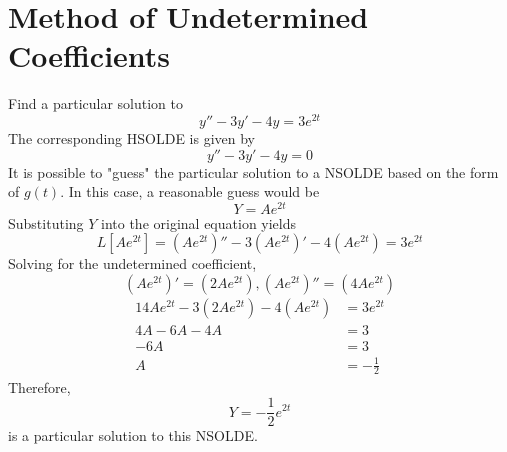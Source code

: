 \documentclass[diffeq.tex]{subfiles}
\begin{document}
    \section{Method of Undetermined Coefficients}
    \begin{example}
        Find a particular solution to
        \begin{equation}
            y''-3y'-4y=3e^{2t}
        \end{equation}
        The corresponding HSOLDE is given by
        \begin{equation}
            y'' - 3y' -4y = 0
        \end{equation}
        It is possible to "guess" the particular solution to a NSOLDE based on the form of $g(t)$. In this case, a reasonable guess would be
        \begin{equation}
            Y = Ae^{2t}
        \end{equation}
        Substituting $Y$ into the original equation yields
        \begin{equation}
            L[Ae^{2t}] = (Ae^{2t})'' - 3(Ae^{2t})' - 4(Ae^{2t}) = 3e^{2t}
        \end{equation}
        Solving for the undetermined coefficient,
        \begin{equation}
            (Ae^{2t})' = (2Ae^{2t}), (Ae^{2t})'' = (4Ae^{2t})
        \end{equation}
        \begin{alignat}{1}
            4Ae^{2t} - 3(2Ae^{2t}) - 4(Ae^{2t}) &= 3e^{2t}\\
            4A - 6A - 4A &= 3\\
            -6A &= 3\\
            A &= -\frac{1}{2}
        \end{alignat}
        Therefore,
        \begin{equation}
            Y = -\frac{1}{2}e^{2t}
        \end{equation}
        is a particular solution to this NSOLDE.
    \end{example}
    \np
\end{document}
